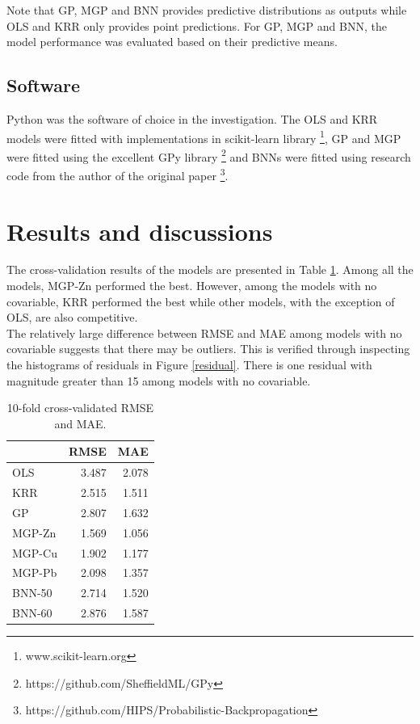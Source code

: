\documentclass{article}
\begin{document}
Note that GP, MGP and BNN provides predictive distributions as outputs while OLS and KRR only provides 
point predictions. For GP, MGP and BNN, the model performance was evaluated based on their predictive means.

\subsection{Software}
Python was the software of choice in the investigation. The OLS and KRR models were fitted with 
implementations in scikit-learn library \footnote{www.scikit-learn.org}, GP and MGP were fitted using 
the excellent GPy library \footnote{https://github.com/SheffieldML/GPy} and 
BNNs were fitted using research code from the author of the original paper \footnote{https://github.com/HIPS/Probabilistic-Backpropagation}.

\section{Results and discussions}
The cross-validation results of the models are presented in Table \ref{result-table}. Among all the 
models, MGP-Zn performed the best. However, among the models with no covariable, KRR performed the best 
while other models, with the exception of OLS, are also competitive.\\

The relatively large difference between RMSE and MAE among models with no covariable suggests that 
there may be outliers. This is verified through inspecting the histograms of residuals in 
Figure \ref{residual}. There is one residual with magnitude greater than 15 among models with no 
covariable.\\

\begin{table}[!htbp]
\centering
\begin{tabular}{|l|r|r|}
\hline
 & RMSE & MAE \\ \hline
OLS & 3.487 & 2.078 \\ \hline
KRR & 2.515 & 1.511 \\ \hline
GP & 2.807 & 1.632 \\ \hline
MGP-Zn & 1.569 & 1.056 \\ \hline
MGP-Cu & 1.902 & 1.177 \\ \hline
MGP-Pb & 2.098 & 1.357 \\ \hline
BNN-50 & 2.714 & 1.520 \\ \hline
BNN-60 & 2.876 & 1.587 \\ \hline
\end{tabular}
\caption{10-fold cross-validated RMSE and MAE.}
\label{result-table}
\end{table}
\end{document}
